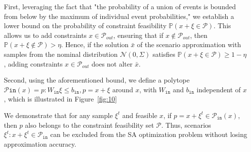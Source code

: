 First, leveraging the fact that "the probability of a union of events is bounded from below by the maximum of individual event probabilities," we establish a lower bound on the probability of constraint feasibility $\mathbb{P}(x+\xi \in \mathcal{P})$. This allows us to add constraints $x\in \mathcal{P}_{out}$, ensuring that if $x \notin \mathcal{P}_{out}$, then $\mathbb{P}(x+\xi \notin \mathcal{P}) > \eta$. Hence, if the solution $\bar x$ of the scenario approximation with samples from the nominal distribution $\mathcal{N}(0,\Sigma)$ satisfies $\mathbb{P}(x+\xi \in \mathcal{P}) \ge 1-\eta$, adding constraints $x \in \mathcal{P}_{out}$ does not alter $\bar x$.

Second, using the aforementioned bound, we define a polytope $\mathcal{P}{\texttt{in}}(x) = {p: W_{\texttt{in}} \xi \le b_{\texttt{in}}, p = x+\xi}$ around $x$, with $W_{\texttt{in}}$ and $b_{\texttt{in}}$ independent of $x$, which is illustrated in Figure~\ref{fig:10}

We demonstrate that for any sample $\xi^t$ and feasible $x$, if $p = x+\xi^t \in \mathcal{P}_{\texttt{in}}(x)$, then $p$ also belongs to the constraint feasibility set $\mathcal{P}$. Thus, scenarios $\xi^t: x+\xi^t \in \mathcal{P}_{\texttt{in}}$ can be excluded from the SA optimization problem  without losing approximation accuracy.

